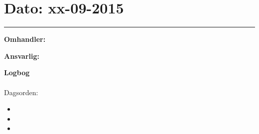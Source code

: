 \section{Dato: xx-09-2015 }
\hrule

\textbf{Omhandler:}  

\textbf{Ansvarlig:} 

\textbf{Logbog}
\\
\\
Dagsorden:
\begin{itemize}
	\item 
	\item 
	\item 
\end{itemize}